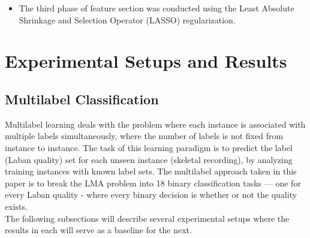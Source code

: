 \documentclass[11pt,twocolumn,varwidth=true,a4paper,fleqn]{article}
\begin{document}
\begin{itemize}
\begin{figure}[h]
{				of features chosen in the first phase on the performance. The
				optimal ratio was 60\%.}
				\label{igFromFclassif}
			\end{figure}
			Examples of qualities and their most significant feature are given in 
			table \ref{bestFeatures}. The ``Information Gain'' metric used
			in the table is defined as:
			\begin{equation*}
			       IG(T,f) = H(T) - H(T|f),
			\end{equation*} 
			where T is the training set, f is a feature, and H() is the information
			entropy of a dataset.
			 \begin{table}[ht!]
			   \centering
			   \caption{Example of several qualities and the feature found to be
			   the most informative for them. ``Relative position'' stands for the
			   position of the joint relative to the ancestor joint in the joint
			   hierarchy.}
			   \label{bestFeatures}
			\end{table}
		\item
		The third phase of feature section was conducted using the Least Absolute Shrinkage and
		Selection Operator (LASSO) regularization.
	\end{itemize}

\section{Experimental Setups and Results}
\subsection{Multilabel Classification}
Multilabel learning deals with the problem where each instance is associated
with multiple labels simultaneously, where the number of labels is not fixed
from instance to instance. The task of this learning paradigm is to predict
the label (Laban quality) set for each unseen instance (skeletal recording), 
by analyzing training instances with known label sets. The multilabel
approach taken in this paper is to break the LMA problem into 18
binary classification tasks --- one for every Laban quality - where every binary
decision is whether or not the quality exists.
\\The following subsections will describe several experimental setups
where the results in each will serve as a baseline for the next.
\end{document}
